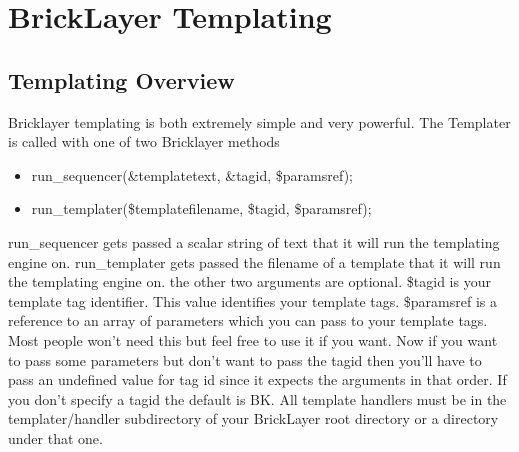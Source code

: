 \chapter{BrickLayer Templating}
\section{Templating Overview}
Bricklayer templating is both extremely simple and very powerful. The Templater is called with one of two Bricklayer methods
\begin{itemize}
\item run\_sequencer(\&templatetext, \&tagid, \$paramsref);
\item run\_templater(\$templatefilename, \$tagid, \$paramsref);
\end{itemize}
run\_sequencer gets passed a scalar string of text that it will run the templating engine on. run\_templater gets passed the filename of a template that it will run the templating engine on. the other two arguments are optional. \$tagid is your template tag identifier. This value identifies your template tags. \$paramsref is a reference to an array of parameters which you can pass to your template tags. Most people won't need this but feel free to use it if you want. Now if you want to pass some parameters but don't want to pass the tagid then you'll have to pass an undefined value for tag id since it expects the arguments in that order. If you don't specify a tagid the default is BK. All template handlers must be in the templater/handler subdirectory of your BrickLayer root directory or a directory under that one.
